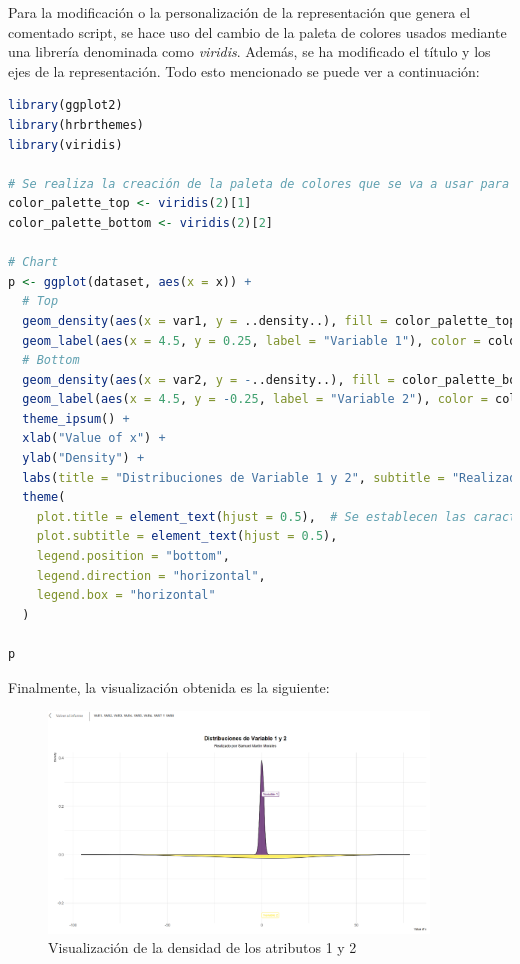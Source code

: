 \documentclass[11pt]{report}
\begin{document}
Para la modificación o la personalización de la representación que genera el comentado script, se hace uso del cambio de la paleta de colores usados mediante una librería denominada como \emph{viridis}. Además, se ha modificado el título y los ejes de la representación. Todo esto mencionado se puede ver a continuación:

\begin{lstlisting}[language=R, breaklines=true, basicstyle=\small\ttfamily]
library(ggplot2)
library(hrbrthemes)
library(viridis)

# Se realiza la creación de la paleta de colores que se va a usar para el top y para el bottom
color_palette_top <- viridis(2)[1]
color_palette_bottom <- viridis(2)[2]

# Chart
p <- ggplot(dataset, aes(x = x)) +
  # Top
  geom_density(aes(x = var1, y = ..density..), fill = color_palette_top, alpha = 0.7) +
  geom_label(aes(x = 4.5, y = 0.25, label = "Variable 1"), color = color_palette_top) +
  # Bottom
  geom_density(aes(x = var2, y = -..density..), fill = color_palette_bottom, alpha = 0.7) +
  geom_label(aes(x = 4.5, y = -0.25, label = "Variable 2"), color = color_palette_bottom) +
  theme_ipsum() +
  xlab("Value of x") +
  ylab("Density") +
  labs(title = "Distribuciones de Variable 1 y 2", subtitle = "Realizado por Samuel Martín Morales") + 
  theme(
    plot.title = element_text(hjust = 0.5),  # Se establecen las características de los textos
    plot.subtitle = element_text(hjust = 0.5),  
    legend.position = "bottom",  
    legend.direction = "horizontal",  
    legend.box = "horizontal"  
  )

p
\end{lstlisting}

Finalmente, la visualización obtenida es la siguiente:

\begin{figure}[H]
  \centering
  \includegraphics[width=0.9\textwidth]{./img/Density-Image.png}
  \caption{Visualización de la densidad de los atributos 1 y 2}
  \label{fig:density}
\end{figure}
\end{document}
